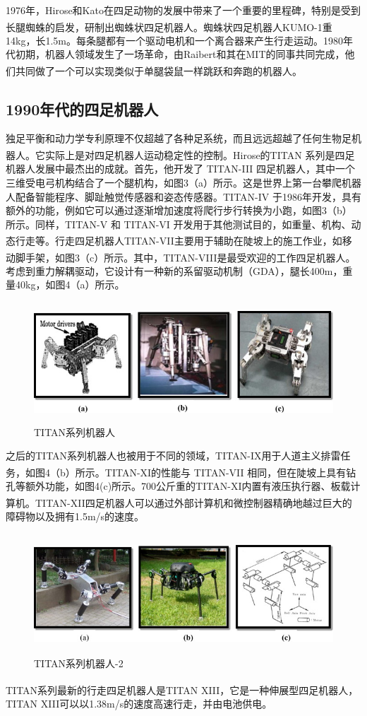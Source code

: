\documentclass[12pt,a4paper]{ctexart}
\newcommand{\supercite}[1]{\textsuperscript{\cite{#1}}}
\begin{document}
1976年，Hirose和Kato在四足动物的发展中带来了一个重要的里程碑，特别是受到长腿蜘蛛的启发，研制出蜘蛛状四足机器人\supercite{8}。蜘蛛状四足机器人KUMO-1重14kg，长1.5m。每条腿都有一个驱动电机和一个离合器来产生行走运动。1980年代初期，机器人领域发生了一场革命，由Raibert和其在MIT的同事共同完成，他们共同做了一个可以实现类似于单腿袋鼠一样跳跃和奔跑的机器人\supercite{9}。
\subsection{1990年代的四足机器人}
独足平衡和动力学专利原理不仅超越了各种足系统，而且远远超越了任何生物足机器人。它实际上是对四足机器人运动稳定性的控制。Hirose的TITAN 系列\supercite{10}是四足机器人发展中最杰出的成就。首先，他开发了 TITAN-III 四足机器人，其中一个三维受电弓机构结合了一个腿机构，如图3（a）所示。这是世界上第一台攀爬机器人配备智能程序、脚趾触觉传感器和姿态传感器。TITAN-IV 于1986年开发，具有额外的功能，例如它可以通过逐渐增加速度将爬行步行转换为小跑，如图3（b）所示。同样，TITAN-V 和 TITAN-VI 开发用于其他测试目的，如重量、机构、动态行走等。行走四足机器人TITAN-VII\supercite{11}主要用于辅助在陡坡上的施工作业，如移动脚手架，如图3（c）所示。其中，TITAN-VIII\supercite{12}是最受欢迎的工作四足机器人。考虑到重力解耦驱动，它设计有一种新的系留驱动机制（GDA），腿长400m，重量40kg，如图4（a）所示。
\begin{figure}[H]
    \centering
    \includegraphics[height=4.5cm]{IMG_03.jpg}
    \caption{TITAN系列机器人}
\end{figure}
之后的TITAN系列机器人也被用于不同的领域，TITAN-IX用于人道主义排雷任务，如图4（b）所示。TITAN-XI\supercite{13}的性能与 TITAN-VII 相同，但在陡坡上具有钻孔等额外功能，如图4(c)所示。700公斤重的TITAN-XI内置有液压执行器、板载计算机。TITAN-XII\supercite{14}四足机器人可以通过外部计算机和微控制器精确地越过巨大的障碍物以及拥有1.5m/s的速度。
\begin{figure}[H]
    \centering
    \includegraphics[height=4.5cm]{IMG_04.jpg}
    \caption{TITAN系列机器人-2}
\end{figure}
TITAN系列最新的行走四足机器人是TITAN XIII\supercite{15}，它是一种伸展型四足机器人，TITAN XIII可以以1.38m/s的速度高速行走，并由电池供电。
\end{document}
